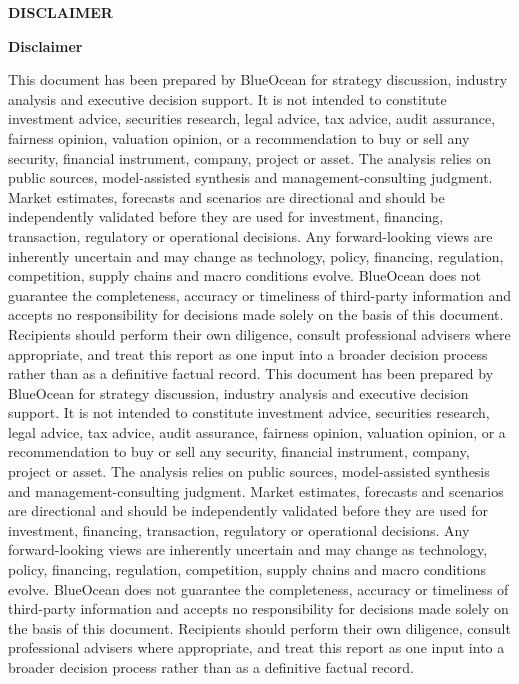 \documentclass[10pt,a4paper]{article}
\begin{document}
\clearpage
{\textcolor{BOBlue}{\scriptsize\bfseries DISCLAIMER}}\par\vspace{3pt}
{\Large\sffamily\bfseries\color{BONavy} Disclaimer}\par\vspace{4pt}
\vspace{2pt}{\color{BOBright}\rule{\linewidth}{1pt}}\vspace{5pt}
{\footnotesize\color{BOMuted} This document has been prepared by BlueOcean for strategy discussion, industry analysis and executive decision support. It is not intended to constitute investment advice, securities research, legal advice, tax advice, audit assurance, fairness opinion, valuation opinion, or a recommendation to buy or sell any security, financial instrument, company, project or asset. The analysis relies on public sources, model-assisted synthesis and management-consulting judgment. Market estimates, forecasts and scenarios are directional and should be independently validated before they are used for investment, financing, transaction, regulatory or operational decisions. Any forward-looking views are inherently uncertain and may change as technology, policy, financing, regulation, competition, supply chains and macro conditions evolve. BlueOcean does not guarantee the completeness, accuracy or timeliness of third-party information and accepts no responsibility for decisions made solely on the basis of this document. Recipients should perform their own diligence, consult professional advisers where appropriate, and treat this report as one input into a broader decision process rather than as a definitive factual record. This document has been prepared by BlueOcean for strategy discussion, industry analysis and executive decision support. It is not intended to constitute investment advice, securities research, legal advice, tax advice, audit assurance, fairness opinion, valuation opinion, or a recommendation to buy or sell any security, financial instrument, company, project or asset. The analysis relies on public sources, model-assisted synthesis and management-consulting judgment. Market estimates, forecasts and scenarios are directional and should be independently validated before they are used for investment, financing, transaction, regulatory or operational decisions. Any forward-looking views are inherently uncertain and may change as technology, policy, financing, regulation, competition, supply chains and macro conditions evolve. BlueOcean does not guarantee the completeness, accuracy or timeliness of third-party information and accepts no responsibility for decisions made solely on the basis of this document. Recipients should perform their own diligence, consult professional advisers where appropriate, and treat this report as one input into a broader decision process rather than as a definitive factual record.}
\end{document}
